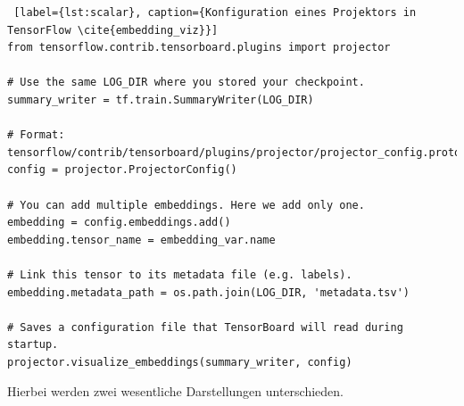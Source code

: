 \begin{minipage}{\linewidth}
\begin{lstlisting} [label={lst:scalar}, caption={Konfiguration eines Projektors in TensorFlow \cite{embedding_viz}}]
from tensorflow.contrib.tensorboard.plugins import projector

# Use the same LOG_DIR where you stored your checkpoint.
summary_writer = tf.train.SummaryWriter(LOG_DIR)

# Format: tensorflow/contrib/tensorboard/plugins/projector/projector_config.proto
config = projector.ProjectorConfig()

# You can add multiple embeddings. Here we add only one.
embedding = config.embeddings.add()
embedding.tensor_name = embedding_var.name

# Link this tensor to its metadata file (e.g. labels).
embedding.metadata_path = os.path.join(LOG_DIR, 'metadata.tsv')

# Saves a configuration file that TensorBoard will read during startup.
projector.visualize_embeddings(summary_writer, config)
\end{lstlisting}
\end{minipage}
\vspace{0.3cm}

Hierbei werden zwei wesentliche Darstellungen unterschieden.
\vspace{10pt}

